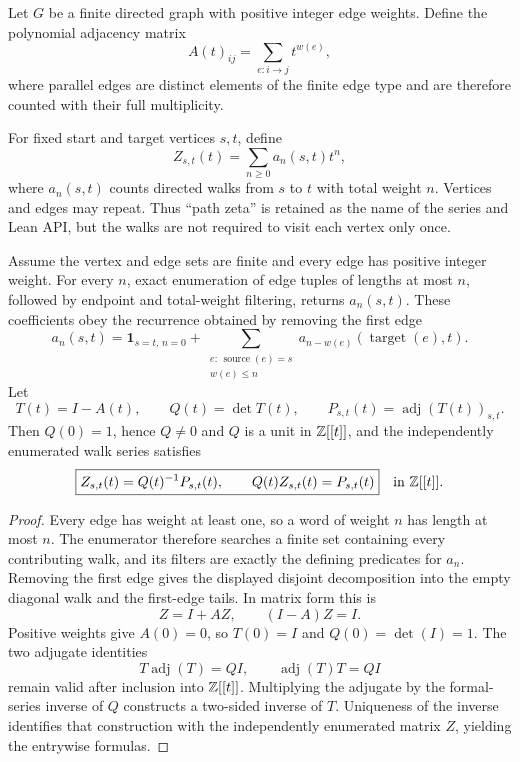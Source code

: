 Let $G$ be a finite directed graph with positive integer edge weights. Define the polynomial adjacency matrix
\[
A(t)_{ij}
=
\sum_{e:i\to j}t^{w(e)},
\]
where parallel edges are distinct elements of the finite edge type and are
therefore counted with their full multiplicity.

For fixed start and target vertices $s,t$, define
\[
Z_{s,t}(t)
=
\sum_{n\ge0}a_n(s,t)t^n,
\]
where $a_n(s,t)$ counts directed walks from $s$ to $t$ with total weight $n$.
Vertices and edges may repeat. Thus ``path zeta'' is retained as the name of
the series and Lean API, but the walks are not required to visit each vertex only once.

\begin{theorem}\label{thm:transfer-zeta}
Assume the vertex and edge sets are finite and every edge has positive integer
weight. For every $n$, exact enumeration of edge tuples of lengths at most
$n$, followed by endpoint and total-weight filtering, returns $a_n(s,t)$.
These coefficients obey the recurrence obtained by removing the first edge
\[
a_n(s,t)
=
\mathbf 1_{s=t,\,n=0}
+\sum_{\substack{e:\,\operatorname{source}(e)=s\\w(e)\le n}}
a_{n-w(e)}(\operatorname{target}(e),t).
\]
Let
\[
T(t)=I-A(t),\qquad
Q(t)=\det T(t),\qquad
P_{s,t}(t)=\operatorname{adj}(T(t))_{s,t}.
\]
Then $Q(0)=1$, hence $Q\ne0$ and $Q$ is a unit in $\mathbb Z[[t]]$, and the
independently enumerated walk series satisfies
\[
\boxed{
Z_{s,t}(t)=Q(t)^{-1}P_{s,t}(t),
\qquad
Q(t)Z_{s,t}(t)=P_{s,t}(t)
}
\quad\text{in }\mathbb Z[[t]].
\]
\end{theorem}

\begin{proof}
Every edge has weight at least one, so a word of weight $n$ has length at
most $n$. The enumerator therefore searches a finite set containing every
contributing walk, and its filters are exactly the defining predicates for
$a_n$. Removing the first edge gives the displayed disjoint decomposition
into the empty diagonal walk and the first-edge tails. In matrix form this is
\[
Z=I+AZ,
\qquad (I-A)Z=I.
\]
Positive weights give $A(0)=0$, so $T(0)=I$ and
$Q(0)=\det(I)=1$. The two adjugate identities
\[
T\operatorname{adj}(T)=Q I,
\qquad
\operatorname{adj}(T)T=Q I
\]
remain valid after inclusion into $\mathbb Z[[t]]$. Multiplying the adjugate by the
formal-series inverse of $Q$ constructs a two-sided inverse of $T$.
Uniqueness of the inverse identifies that construction with the independently
enumerated matrix $Z$, yielding the entrywise formulas.
\end{proof}

